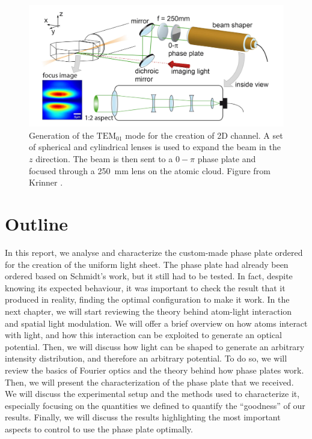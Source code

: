 \begin{figure}
    \includegraphics[width=\textwidth]{chapters/chapter_1/figures/beam_shaper.png}
    \caption[short]{Generation of the $\text{TEM}_{01}$ mode for the creation of 2D channel. A set of spherical and cylindrical lenses is used to expand the beam in the $z$ direction. The beam is then sent to a $0-\pi$ phase plate and focused through a \SI{250}{mm} lens on the atomic cloud. Figure from Krinner \cite{krinner2015b}.}
    \label{fig:beam_shaper}
\end{figure}

\section{Outline}
In this report, we analyse and characterize the custom-made phase plate ordered for the creation of the uniform light sheet. The phase plate had already been ordered based on Schmidt's work, but it still had to be tested. In fact, despite knowing its expected behaviour, it was important to check the result that it produced in reality, finding the optimal configuration to make it work.
In the next chapter, we will start reviewing the theory behind atom-light interaction and spatial light modulation. We will offer a brief overview on how atoms interact with light, and how this interaction can be exploited to generate an optical potential. Then, we will discuss how light can be shaped to generate an arbitrary intensity distribution, and therefore an arbitrary potential. To do so, we will review the basics of Fourier optics and the theory behind how phase plates work. Then, we will present the characterization of the phase plate that we received. We will discuss the experimental setup and the methods used to characterize it, especially focusing on the quantities we defined to quantify the \enquote{goodness} of our results. Finally, we will discuss the results highlighting the most important aspects to control to use the phase plate optimally.